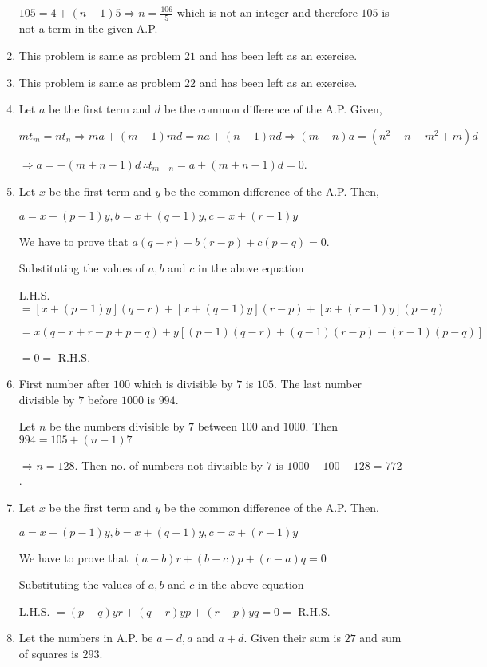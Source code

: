 \begin{enumerate}
  $105 = 4 + (n - 1)5 \Rightarrow n = \frac{106}{5}$ which is not an integer and therefore $105$ is not a term in the given A.P.
\item This problem is same as problem $21$ and has been left as an exercise.
\item This problem is same as problem $22$ and has been left as an exercise.
\item Let $a$ be the first term and $d$ be the common difference of the A.P. Given,

  $mt_m = nt_n \Rightarrow ma + (m - 1)md = na + (n - 1)nd \Rightarrow (m - n)a = (n^2 - n - m^2 + m)d$

  $\Rightarrow a = -(m + n - 1)d\,\therefore t_{m + n} = a + (m + n - 1)d = 0$.
\item Let $x$ be the first term and $y$ be the common difference of the A.P. Then,

  $a = x + (p - 1)y, b = x + (q - 1)y, c = x + (r - 1)y$

  We have to prove that $a(q - r) + b(r - p) + c(p - q) = 0$.

  Substituting the values of $a, b$ and $c$ in the above equation

  L.H.S. $= [x + (p - 1)y](q - r) + [x + (q - 1)y](r - p) + [x + (r - 1)y](p - q)$

  $= x(q - r + r - p + p - q) + y[(p - 1)(q - r) + (q - 1)(r - p) + (r - 1)(p - q)]$

  $= 0 =$ R.H.S.
\item First number after $100$ which is divisible by $7$ is $105$. The last number divisible by $7$ before $1000$ is $994$.

  Let $n$ be the numbers divisible by $7$ between $100$ and $1000$. Then $994 = 105 + (n - 1)7$

  $\Rightarrow n = 128$. Then no. of numbers not divisible by $7$ is $1000 - 100 - 128 = 772$.
\item Let $x$ be the first term and $y$ be the common difference of the A.P. Then,

  $a = x + (p - 1)y, b = x + (q - 1)y, c = x + (r - 1)y$

  We have to prove that $(a - b)r + (b - c)p + (c - a)q = 0$

  Substituting the values of $a, b$ and $c$ in the above equation

  L.H.S. $= (p - q)yr + (q - r)yp + (r - p)yq = 0 =$ R.H.S.
\item Let the numbers in A.P. be $a - d, a$ and $a + d$. Given their sum is $27$ and sum of squares is $293$.


\end{enumerate}
